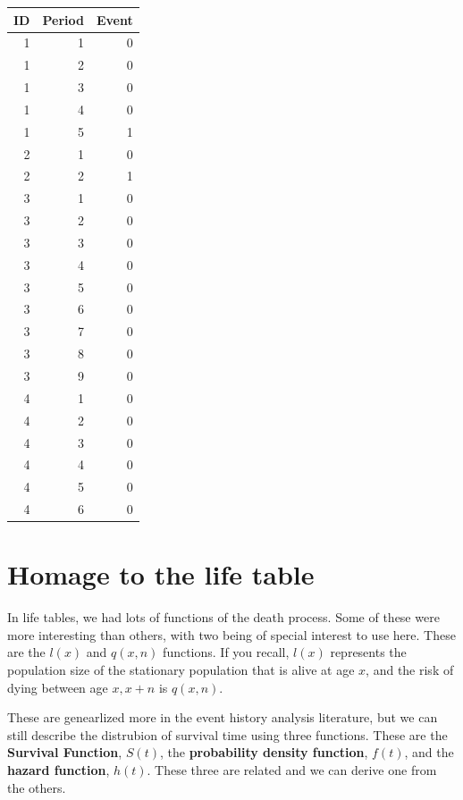 \documentclass[
  letterpaper,
  DIV=11,
  numbers=noendperiod]{scrreprt}
\begin{document}
\begin{table}
\centering
\begin{tabular}{|>{}r|||>{}r|||>{}r|}
\hline
ID & Period & Event\\
\hline
1 & 1 & 0\\
\hline
1 & 2 & 0\\
\hline
1 & 3 & 0\\
\hline
1 & 4 & 0\\
\hline
1 & 5 & 1\\
\hline
2 & 1 & 0\\
\hline
2 & 2 & 1\\
\hline
3 & 1 & 0\\
\hline
3 & 2 & 0\\
\hline
3 & 3 & 0\\
\hline
3 & 4 & 0\\
\hline
3 & 5 & 0\\
\hline
3 & 6 & 0\\
\hline
3 & 7 & 0\\
\hline
3 & 8 & 0\\
\hline
3 & 9 & 0\\
\hline
4 & 1 & 0\\
\hline
4 & 2 & 0\\
\hline
4 & 3 & 0\\
\hline
4 & 4 & 0\\
\hline
4 & 5 & 0\\
\hline
4 & 6 & 0\\
\hline
\end{tabular}
\end{table}

\hypertarget{homage-to-the-life-table}{%
\section{Homage to the life table}\label{homage-to-the-life-table}}

In life tables, we had lots of functions of the death process. Some of
these were more interesting than others, with two being of special
interest to use here. These are the \(l(x)\) and \(q(x, n)\) functions.
If you recall, \(l(x)\) represents the population size of the stationary
population that is alive at age \(x\), and the risk of dying between age
\(x, x+n\) is \(q(x, n)\).

These are genearlized more in the event history analysis literature, but
we can still describe the distrubion of survival time using three
functions. These are the \textbf{Survival Function}, \(S(t)\), the
\textbf{probability density function}, \(f(t)\), and the \textbf{hazard
function}, \(h(t)\). These three are related and we can derive one from
the others.
\end{document}
